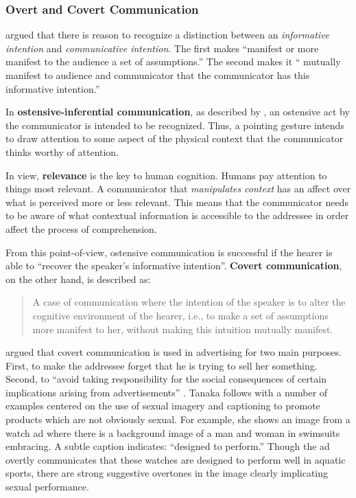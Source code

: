  \subsubsection{Overt and Covert Communication} 

 \cite{Sperber:1986uk}  argued that there is reason to recognize a distinction between an \emph{informative intention} and \emph{communicative intention}. The first makes ``manifest or more manifest to the audience a set of assumptions.''  \citep[p. 58]{Sperber:1986uk}  The second makes it `` mutually manifest to audience and communicator that the communicator has this informative intention.''  \citep[p. 61]{Sperber:1986uk} 

\begin{sloppier}
In \textbf{ostensive-inferential communication}, as described by \cite{Sperber:1986uk}, an ostensive act by the communicator is intended to be recognized. Thus, a pointing gesture intends to draw attention to some aspect of the physical context that the communicator thinks worthy of attention. 
\end{sloppier}

In  \cite{Sperber:1986uk}  view, \textbf{relevance} is the key to human cognition. Humans pay attention to things most relevant. A communicator that \emph{manipulates context} has an affect over what is perceived more or less relevant. This means that the communicator needs to be aware of what contextual information is accessible to the addressee in order affect the process of comprehension.

From this point-of-view, ostensive communication is successful if the hearer is able to ``recover the speaker's informative intention''. \textbf{Covert communication}, on the other hand, is described as:

\begin{quote}
A case of communication where the intention of the speaker is to alter the cognitive environment of the hearer, i.e., to make a set of assumptions more manifest to her, without making this intuition mutually manifest. \citep[as quoted in Tanaka 1994, p. 41]{Bencherif:1987up}
\end{quote}

 \cite{Tanaka:1999tq}  argued that covert communication is used in advertising for two main purposes. First, to make the addressee forget that he is trying to sell her something. Second, to ``avoid taking responsibility for the social consequences of certain implications arising from advertisements''  \citep[p. 44]{Tanaka:1999tq}.  Tanaka follows with a number of examples centered on the use of sexual imagery and captioning to promote products which are not obviously sexual. For example, she shows an image from a watch ad where there is a background image of a man and woman in swimsuits embracing. A subtle caption indicates: ``designed to perform.'' Though the ad overtly communicates that these watches are designed to perform well in aquatic sports, there are strong suggestive overtones in the image clearly implicating sexual performance.

